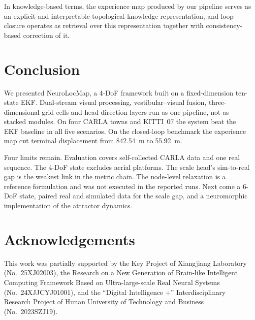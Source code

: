 \documentclass[review,12pt]{elsarticle}
\begin{document}
In knowledge-based terms, the experience map produced by our pipeline serves as an explicit and interpretable topological knowledge representation, and loop closure operates as retrieval over this representation together with consistency-based correction of it.











\section{Conclusion}
\label{sec:conclusion}

We presented NeuroLocMap, a 4-DoF framework built on a fixed-dimension ten-state EKF. Dual-stream visual processing, vestibular--visual fusion, three-dimensional grid cells and head-direction layers run as one pipeline, not as stacked modules. On four CARLA towns and KITTI~07 the system beat the EKF baseline in all five scenarios. On the closed-loop benchmark the experience map cut terminal displacement from 842.54~m to 55.92~m.

Four limits remain. Evaluation covers self-collected CARLA data and one real sequence. The 4-DoF state excludes aerial platforms. The scale head's sim-to-real gap is the weakest link in the metric chain. The node-level relaxation is a reference formulation and was not executed in the reported runs. Next come a 6-DoF state, paired real and simulated data for the scale gap, and a neuromorphic implementation of the attractor dynamics.

\section*{Acknowledgements}


This work was partially supported by the Key Project of Xiangjiang Laboratory (No.~25XJ02003), the Research on a New Generation of Brain-like Intelligent Computing Framework Based on Ultra-large-scale Real Neural Systems (No.~24XJJCYJ01001), and the ``Digital Intelligence +'' Interdisciplinary Research Project of Hunan University of Technology and Business (No.~2023SZJ19).
\end{document}
